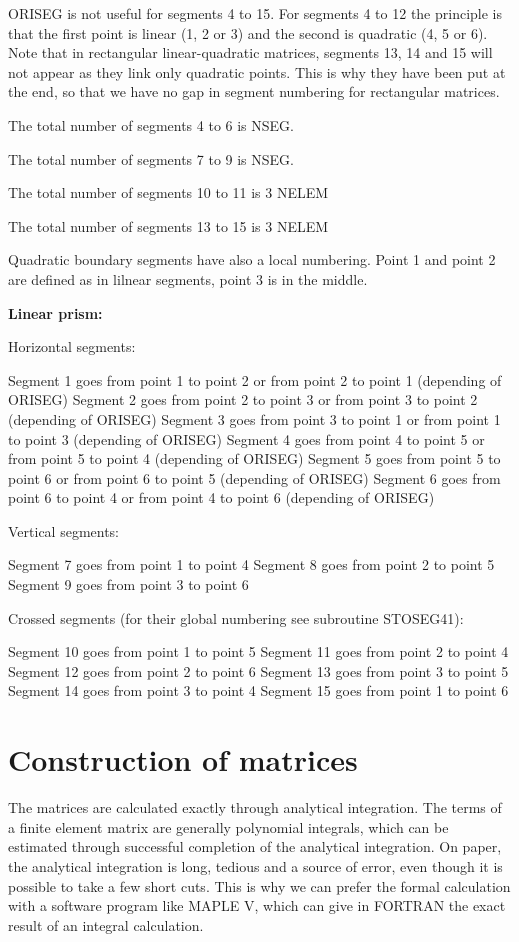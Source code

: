 ORISEG is not useful for segments 4 to 15. For segments 4 to 12 the principle
is that the first point is linear (1, 2 or 3) and the second is quadratic (4, 5
or 6). Note that in rectangular linear-quadratic matrices, segments 13, 14 and
15 will not appear as they link only quadratic points. This is why they have
been put at the end, so that we have no gap in segment numbering for
rectangular matrices.

The total number of segments 4 to 6 is NSEG.

The total number of segments 7 to 9 is NSEG.

The total number of segments 10 to 11 is 3 NELEM

The total number of segments 13 to 15 is 3 NELEM

Quadratic boundary segments have also a local numbering. Point 1 and point 2
are defined as in lilnear segments, point 3 is in the middle.

\textbf{Linear prism:}

Horizontal segments:

Segment 1 goes from point 1 to point 2 or from point 2 to point 1 (depending of ORISEG)
Segment 2 goes from point 2 to point 3 or from point 3 to point 2 (depending of ORISEG)
Segment 3 goes from point 3 to point 1 or from point 1 to point 3 (depending of ORISEG)
Segment 4 goes from point 4 to point 5 or from point 5 to point 4 (depending of ORISEG)
Segment 5 goes from point 5 to point 6 or from point 6 to point 5 (depending of ORISEG)
Segment 6 goes from point 6 to point 4 or from point 4 to point 6 (depending of ORISEG)

Vertical segments:

Segment 7 goes from point 1 to point 4
Segment 8 goes from point 2 to point 5
Segment 9 goes from point 3 to point 6

Crossed segments (for their global numbering see subroutine STOSEG41):

Segment 10 goes from point 1 to point 5
Segment 11 goes from point 2 to point 4
Segment 12 goes from point 2 to point 6
Segment 13 goes from point 3 to point 5
Segment 14 goes from point 3 to point 4
Segment 15 goes from point 1 to point 6

\section{Construction of matrices}

The \bief matrices are calculated exactly through analytical integration. The
terms of a finite element matrix are generally polynomial integrals, which can
be estimated through successful completion of the analytical integration. On
paper, the analytical integration is long, tedious and a source of error, even
though it is possible to take a few short cuts. This is why we can prefer the
formal calculation with a software program like MAPLE V, which can give in FORTRAN
the exact result of an integral calculation.

